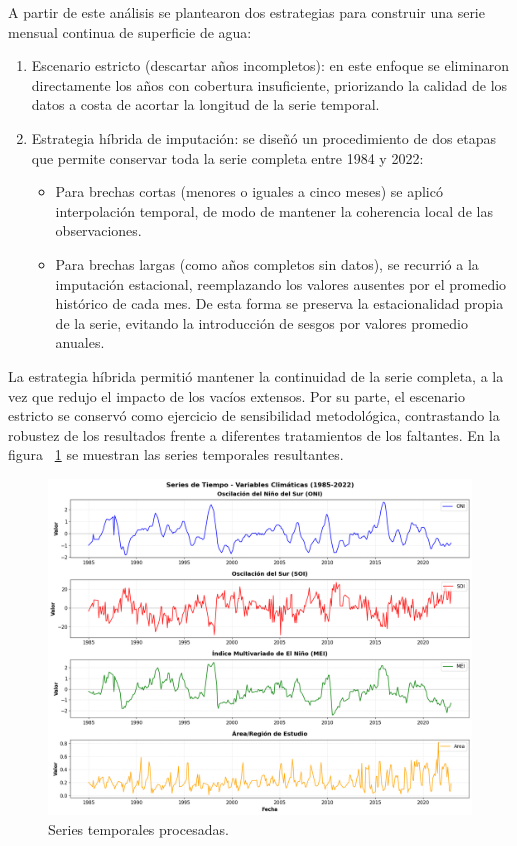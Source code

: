 A partir de este análisis se plantearon dos estrategias para construir una serie mensual 
continua de superficie de agua:

\begin{enumerate}
    \item Escenario estricto (descartar años incompletos): en este enfoque se 
    eliminaron directamente los años con cobertura insuficiente, priorizando la calidad 
    de los datos a costa de acortar la longitud de la serie temporal. 

    \item Estrategia híbrida de imputación: se diseñó un procedimiento de dos 
    etapas que permite conservar toda la serie completa entre 1984 y 2022: 
    \begin{itemize}
        \item Para brechas cortas (menores o iguales a cinco meses) se aplicó 
        interpolación temporal, de modo de mantener la coherencia local de las 
        observaciones.
        \item Para brechas largas (como años completos sin datos), se recurrió a 
        la imputación estacional, reemplazando los valores ausentes por el promedio 
        histórico de cada mes. De esta forma se preserva la estacionalidad propia de la 
        serie, evitando la introducción de sesgos por valores promedio anuales.
    \end{itemize}
\end{enumerate}


La estrategia híbrida permitió mantener la continuidad de la serie completa, a la vez 
que redujo el impacto de los vacíos extensos. Por su parte, el escenario estricto se 
conservó como ejercicio de sensibilidad metodológica, contrastando la robustez de los 
resultados frente a diferentes tratamientos de los faltantes. En la figura ~\ref{fig:ts_final} se muestran las series temporales resultantes.


\begin{figure}[ht]
        \centering
        \includegraphics[scale=.32]
        {Figures/ts_final.png}
        \caption{Series temporales procesadas.}
        \label{fig:ts_final}
\end{figure}

